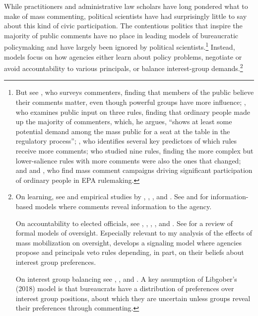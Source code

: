 While practitioners and administrative law scholars have long pondered what to make of mass commenting, political scientists have had surprisingly little to say about this kind of civic participation. 
The contentious politics that inspire the majority of public comments have no place in leading models of bureaucratic policymaking and have largely been ignored by political scientists.\footnote{ 
But see \citet{Yackee2015JPART}, who surveys commenters, finding that members of the public believe their comments matter, even though powerful groups have more influence; \citet{Cuellar2005}, who examines public input on three rules, finding that ordinary people made up the majority of commenters, which, he argues, ``shows at least some potential demand among the mass public for a seat at the table in the regulatory process''; \citet{Moore2017}, who identifies several key predictors of which rules receive more comments; \citet{Shapiro2008} who studied nine rules, finding the more complex but lower-salience rules with more comments were also the ones that changed; and \citet{Balla2018} and \citet{Potter2017}, who find mass comment campaigns driving significant participation of ordinary people in EPA rulemaking. 
}
Instead, models focus on how agencies either learn about policy problems, negotiate or avoid accountability to various principals, or balance interest-group demands.\footnote{
On learning, see \citet{Kerwin2011} and empirical studies by \citet{yackee2012}, \citet{Cook2017}, \citep{Gordon2018}, and \citet{Walters2019}. See \citet{Gailmard2017} and \citet{Libgober2018} for information-based models where comments reveal information to the agency. 

On accountability to elected officials, see  \citet{Furlong1997}, \citet{Nou2016}, \citet{Potter2016}, \citet{Woods2018}, and \citet{Yackee2009RegGov}. See \cite{Gailmard2012} for a review of formal models of oversight.
Especially relevant to my analysis of the effects of mass mobilization on oversight, \citet{Potter2014dis} develops a signaling model where agencies propose and principals veto rules depending, in part, on their beliefs about interest group preferences. 

On interest group balancing see \citet{Yackee2006JOP},  \citet{Yackee2006JPART}, and \citet{Kerwin2011}. A key assumption of Libgober's (2018) model is that bureaucrats have a distribution of preferences over interest group positions, about which they are uncertain unless groups reveal their preferences through commenting.
} 

